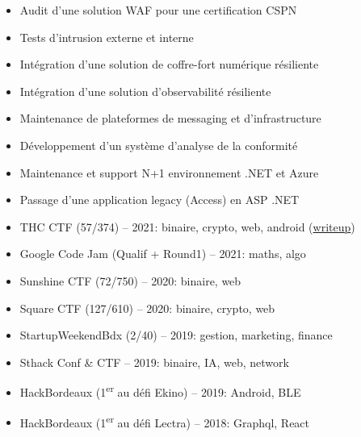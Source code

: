 \documentclass[10pt,a4paper,ragged2e,withhyper]{altacv}
\begin{document}
\begin{paracol}{2}

\begin{itemize}
\item Audit d'une solution WAF pour une certification CSPN
\item Tests d'intrusion externe et interne
\end{itemize}

\divider

\begin{itemize}
\item Intégration d'une solution de coffre-fort numérique résiliente
\item Intégration d'une solution d'observabilité résiliente
\item Maintenance de plateformes de messaging et d'infrastructure
\end{itemize}

\divider

\begin{itemize}
  \item Développement d'un système d'analyse de la conformité
  \item Maintenance et support N+1 environnement .NET et Azure
\end{itemize}

\divider

\begin{itemize}
  \item Passage d'une application legacy (Access) en ASP .NET
\end{itemize}


  \begin{itemize}
    \item THC CTF (57/374) -- 2021: binaire, crypto, web, android (\href{https://blog.tic.sh/thc-2021-mission-impossible/}{\color{PastelRed}writeup})
    \item Google Code Jam (Qualif + Round1) -- 2021: maths, algo
    \item Sunshine CTF (72/750) -- 2020: binaire, web
    \item Square CTF (127/610) -- 2020: binaire, crypto, web
    \item StartupWeekendBdx (2/40) -- 2019: gestion, marketing, finance
    \item Sthack Conf \& CTF -- 2019: binaire, IA, web, network
    \item HackBordeaux (1\textsuperscript{er} au défi Ekino) -- 2019: Android, BLE
    \item HackBordeaux (1\textsuperscript{er} au défi Lectra) -- 2018: Graphql, React
  \end{itemize}


\end{paracol}
\end{document}
